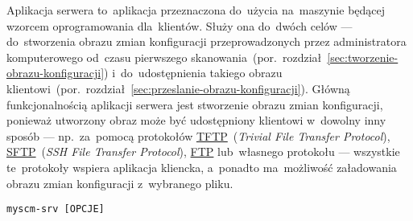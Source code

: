 \documentclass[thesis]{subfiles}
\begin{document}
\newcommand{\srvappname}{myscm-srv}
\newcommand{\myscmsrvconfig}{\path{/etc/myscm-srv/myscm-srv.conf}}

Aplikacja serwera to~aplikacja przeznaczona do~użycia na~maszynie będącej wzorcem oprogramowania dla~klientów. Służy ona do~dwóch celów --- do~stworzenia obrazu zmian konfiguracji przeprowadzonych przez administratora komputerowego od~czasu pierwszego skanowania~(por.~rozdział~\ref{sec:tworzenie-obrazu-konfiguracji}) i~do~udostępnienia takiego obrazu klientowi~(por.~rozdział~\ref{sec:przeslanie-obrazu-konfiguracji}). Główną funkcjonalnością aplikacji serwera jest stworzenie obrazu zmian konfiguracji, ponieważ utworzony obraz może być udostępniony klientowi w~dowolny inny sposób --- np.~za~pomocą protokołów \href{https://en.wikipedia.org/wiki/Trivial_File_Transfer_Protocol}{TFTP}~(\emph{Trivial File Transfer Protocol}), \href{https://en.wikipedia.org/wiki/SSH_File_Transfer_Protocol}{SFTP}~(\emph{SSH File Transfer Protocol}), \href{https://en.wikipedia.org/wiki/File_Transfer_Protocol}{FTP} lub~własnego protokołu --- wszystkie te~protokoły wspiera aplikacja kliencka, a~ponadto ma~możliwość załadowania obrazu zmian konfiguracji z~wybranego pliku.

\begin{lstlisting}[label=lst:myscm-srv-usage,numbers=none,caption={Szablon użycia aplikacji serwera}]
myscm-srv [OPCJE]
\end{lstlisting}
\end{document}

